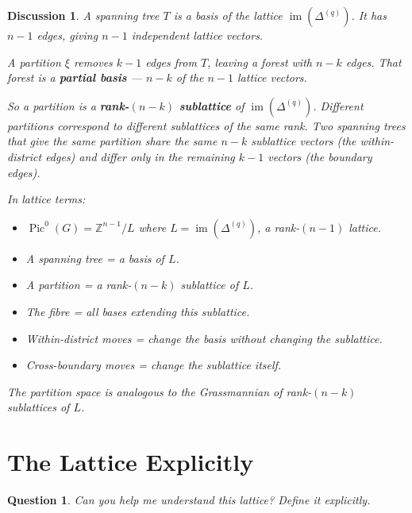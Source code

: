 \documentclass[11pt]{article}
\newcommand{\Z}{\mathbb{Z}}
\newcommand{\Pic}{\operatorname{Pic}^0}
\newtheorem{question}{Question}
\newtheorem{answer}{Discussion}
\begin{document}
\begin{answer}
A spanning tree $T$ is a basis of the lattice
$\operatorname{im}(\Delta^{(q)})$. It has $n-1$ edges, giving $n-1$
independent lattice vectors.

A partition $\xi$ removes $k-1$ edges from $T$, leaving a forest with $n-k$
edges. That forest is a \textbf{partial basis} --- $n-k$ of the $n-1$ lattice
vectors.

So a partition is a \textbf{rank-$(n-k)$ sublattice} of
$\operatorname{im}(\Delta^{(q)})$. Different partitions correspond to
different sublattices of the same rank. Two spanning trees that give the same
partition share the same $n-k$ sublattice vectors (the within-district edges)
and differ only in the remaining $k-1$ vectors (the boundary edges).

In lattice terms:
\begin{itemize}
  \item $\Pic(G) = \Z^{n-1} / L$ where $L = \operatorname{im}(\Delta^{(q)})$,
    a rank-$(n-1)$ lattice.
  \item A spanning tree = a basis of $L$.
  \item A partition = a rank-$(n-k)$ sublattice of $L$.
  \item The fibre = all bases extending this sublattice.
  \item Within-district moves = change the basis without changing the
    sublattice.
  \item Cross-boundary moves = change the sublattice itself.
\end{itemize}

The partition space is analogous to the Grassmannian of rank-$(n-k)$
sublattices of $L$.
\end{answer}


\section{The Lattice Explicitly}

\begin{question}
Can you help me understand this lattice? Define it explicitly.
\end{question}
\end{document}
